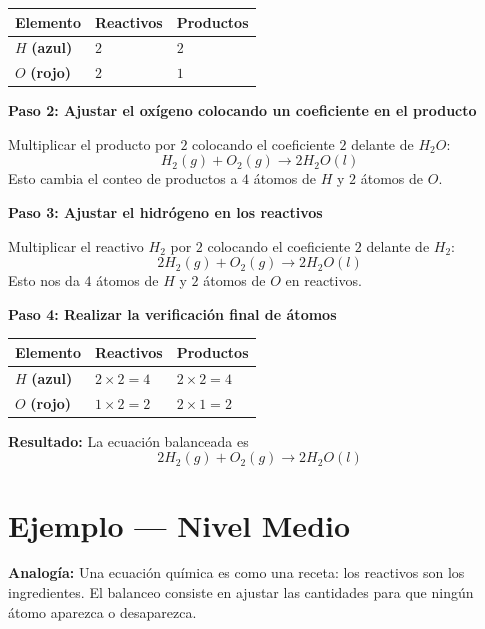\documentclass[
  spanish,
  letterpaper,
  12pt,
  oneside,
  open=any]{scrbook}
\newcounter{none} %
\newcommand{\setcolorsection}[2]{%
  \definecolor{currentsectionbg}{HTML}{#1}%
  \definecolor{currentsectionborder}{HTML}{#2}%
}
\begin{document}
{\def\LTcaptype{none} %
\begin{longtable}[]{@{}lll@{}}
\toprule\noalign{}
Elemento & Reactivos & Productos \\
\midrule\noalign{}
\endhead
\bottomrule\noalign{}
\endlastfoot
\(H\) \textbf{(azul)} & \(2\) & \(2\) \\
\(O\) \textbf{(rojo)} & \(2\) & \(1\) \\
\end{longtable}
}

\textbf{Paso 2: Ajustar el oxígeno colocando un coeficiente en el
producto}

Multiplicar el producto por \(2\) colocando el coeficiente \(2\) delante
de \(H_2O\): \[H_2(g) + O_2(g) \rightarrow 2H_2O(l)\] Esto cambia el
conteo de productos a \(4\) átomos de \(H\) y \(2\) átomos de \(O\).

\textbf{Paso 3: Ajustar el hidrógeno en los reactivos}

Multiplicar el reactivo \(H_2\) por \(2\) colocando el coeficiente \(2\)
delante de \(H_2\): \[2H_2(g) + O_2(g) \rightarrow 2H_2O(l)\] Esto nos
da \(4\) átomos de \(H\) y \(2\) átomos de \(O\) en reactivos.

\textbf{Paso 4: Realizar la verificación final de átomos}

{\def\LTcaptype{none} %
\begin{longtable}[]{@{}lll@{}}
\toprule\noalign{}
Elemento & Reactivos & Productos \\
\midrule\noalign{}
\endhead
\bottomrule\noalign{}
\endlastfoot
\(H\) \textbf{(azul)} & \(2 \times 2 = 4\) & \(2 \times 2 = 4\) \\
\(O\) \textbf{(rojo)} & \(1 \times 2 = 2\) & \(2 \times 1 = 2\) \\
\end{longtable}
}

\textbf{Resultado:} La ecuación balanceada es
\[2H_2(g) + O_2(g) \rightarrow 2H_2O(l)\]

\setcolorsection{b3d9f0}{94c4e0}

\section{Ejemplo --- Nivel Medio}\label{ejemplo-nivel-medio-1}

\textbf{Analogía:} Una ecuación química es como una receta: los
reactivos son los ingredientes. El balanceo consiste en ajustar las
cantidades para que ningún átomo aparezca o desaparezca.
\end{document}
